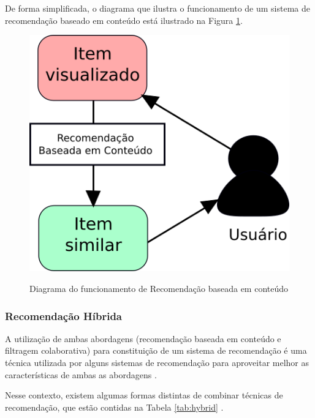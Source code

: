 \documentclass[
	12pt,				%
	oneside,			%
	a4paper,			%
	chapter=TITLE,		%
	english,			%
	french,				%
	spanish,			%
	brazil				%
	]{abntex2}
\begin{document}
De forma simplificada, o diagrama que ilustra o funcionamento de um sistema de recomendação baseado em conteúdo está ilustrado na Figura \ref{fig:recomconteudo}.

\begin{figure}[H]
    \centering
    \caption{Diagrama do funcionamento de Recomendação baseada em conteúdo}
    \includegraphics[scale=0.65]{images/recomconteudo.png}
    \label{fig:recomconteudo}
\end{figure}

\subsubsection{Recomendação Híbrida}

A utilização de ambas abordagens (recomendação baseada em conteúdo e filtragem colaborativa) para constituição de um sistema de recomendação é uma técnica utilizada por alguns sistemas de recomendação para aproveitar melhor as características de ambas as abordagens \cite{balabanovic1997fab}.

Nesse contexto, existem algumas formas distintas de combinar técnicas de recomendação, que estão contidas na Tabela \ref{tab:hybrid} \cite{burke2007hybrid}.
\end{document}
